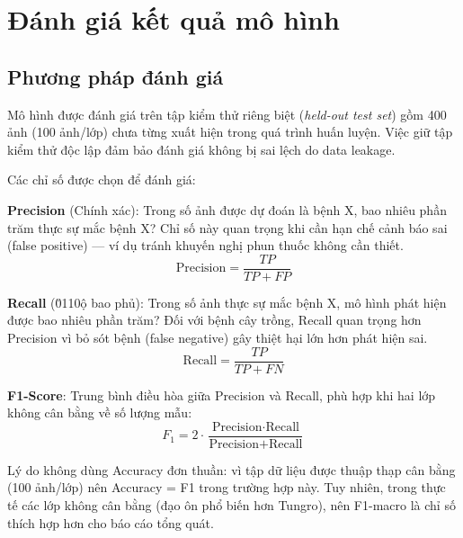 \documentclass[13pt,a4paper]{extreport}
\begin{document}
\section{Đánh giá kết quả mô hình}

\subsection{Phương pháp đánh giá}
Mô hình được đánh giá trên tập kiểm thử riêng biệt (\textit{held-out test set}) gồm 400 ảnh (100 ảnh/lớp) chưa từng xuất hiện trong quá trình huấn luyện. Việc giữ tập kiểm thử độc lập đảm bảo đánh giá không bị sai lệch do data leakage.

Các chỉ số được chọn để đánh giá:

\textbf{Precision} (Chính xác): Trong số ảnh được dự đoán là bệnh X, bao nhiêu phần trăm thực sự mắc bệnh X? Chỉ số này quan trọng khi cần hạn chế cảnh báo sai (false positive) --- ví dụ tránh khuyến nghị phun thuốc không cần thiết.
\begin{equation}
    \text{Precision} = \frac{TP}{TP + FP}
\end{equation}

\textbf{Recall} (\u0110ộ bao phủ): Trong số ảnh thực sự mắc bệnh X, mô hình phát hiện được bao nhiêu phần trăm? Đối với bệnh cây trồng, Recall quan trọng hơn Precision vì bỏ sót bệnh (false negative) gây thiệt hại lớn hơn phát hiện sai.
\begin{equation}
    \text{Recall} = \frac{TP}{TP + FN}
\end{equation}

\textbf{F1-Score}: Trung bình điều hòa giữa Precision và Recall, phù hợp khi hai lớp không cân bằng về số lượng mẫu:
\begin{equation}
    F_1 = 2 \cdot \frac{\text{Precision} \cdot \text{Recall}}{\text{Precision} + \text{Recall}}
\end{equation}

Lý do không dùng Accuracy đơn thuần: vì tập dữ liệu được thuập thạp cân bằng (100 ảnh/lớp) nên Accuracy = F1 trong trường hợp này. Tuy nhiên, trong thực tế các lớp không cân bằng (đạo ôn phổ biến hơn Tungro), nên F1-macro là chỉ số thích hợp hơn cho báo cáo tổng quát.
\end{document}
